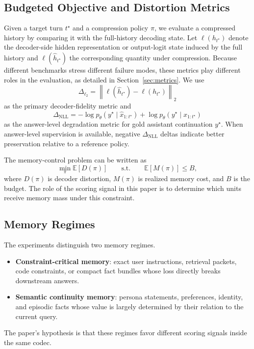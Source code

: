 \documentclass[11pt]{article}
\newcommand{\E}{\mathbb{E}}
\newcommand{\Logit}{\Delta_{\ell_2}}
\newcommand{\NLL}{\Delta_{\mathrm{NLL}}}
\begin{document}
\subsection{Budgeted Objective and Distortion Metrics}
Given a target turn $t^\star$ and a compression policy $\pi$, we evaluate a compressed history by comparing it with the full-history decoding state. Let $\ell(h_{t^\star})$ denote the decoder-side hidden representation or output-logit state induced by the full history and $\ell(\widehat{h}_{t^\star})$ the corresponding quantity under compression. Because different benchmarks stress different failure modes, these metrics play different roles in the evaluation, as detailed in Section~\ref{sec:metrics}. We use
\begin{equation}
\Logit = \left\lVert \ell(\widehat{h}_{t^\star}) - \ell(h_{t^\star}) \right\rVert_2
\end{equation}
as the primary decoder-fidelity metric and
\begin{equation}
\NLL = -\log p_\theta(y^\star \mid \widehat{x}_{1:t^\star}) + \log p_\theta(y^\star \mid x_{1:t^\star})
\end{equation}
as the answer-level degradation metric for gold assistant continuation $y^\star$. When answer-level supervision is available, negative $\NLL$ deltas indicate better preservation relative to a reference policy.

The memory-control problem can be written as
\begin{equation}
\min_{\pi} \E[D(\pi)] \qquad \text{s.t.} \qquad \E[M(\pi)] \leq B,
\end{equation}
where $D(\pi)$ is decoder distortion, $M(\pi)$ is realized memory cost, and $B$ is the budget. The role of the scoring signal in this paper is to determine which units receive memory mass under this constraint.

\subsection{Memory Regimes}
The experiments distinguish two memory regimes.
\begin{itemize}[leftmargin=1.25em]
    \item \textbf{Constraint-critical memory}: exact user instructions, retrieval packets, code constraints, or compact fact bundles whose loss directly breaks downstream answers.
    \item \textbf{Semantic continuity memory}: persona statements, preferences, identity, and episodic facts whose value is largely determined by their relation to the current query.
\end{itemize}
The paper's hypothesis is that these regimes favor different scoring signals inside the same codec.
\end{document}
